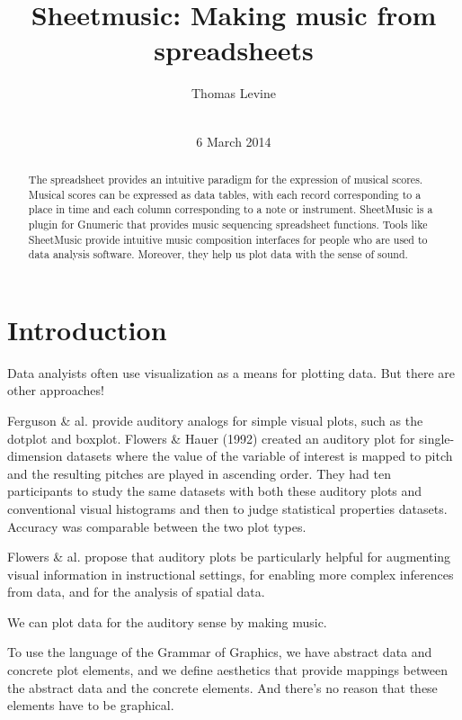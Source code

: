\documentclass{acm_proc_article-sp}
\begin{document}
\title{Sheetmusic: Making music from spreadsheets}
\author{
\alignauthor
Thomas Levine\\
       \\
}
\date{6 March 2014}
\maketitle
\begin{abstract}
The spreadsheet provides an intuitive paradigm for the expression of musical
scores. Musical scores can be expressed as data tables, with each record
corresponding to a place in time and each column corresponding to a note
or instrument. SheetMusic is a plugin for Gnumeric that provides music
sequencing spreadsheet functions. Tools like SheetMusic provide intuitive
music composition interfaces for people who are used to data analysis software.
Moreover, they help us plot data with the sense of sound.
\end{abstract}
\section{Introduction}
Data analyists often use visualization as a means for plotting data.
But there are other approaches!

Ferguson \& al. \cite{ferguson} provide auditory analogs for simple
visual plots, such as the dotplot and boxplot.
Flowers \& Hauer (1992) \cite{flowers1992} created an auditory plot for
single-dimension datasets where the value of the variable of interest
is mapped to pitch and the resulting pitches are played in ascending
order. They had ten participants to study the same datasets with both
these auditory plots and conventional visual histograms and then to
judge statistical properties datasets. Accuracy was comparable between
the two plot types.

Flowers \& al. \cite{flowers2005} propose that auditory plots be
particularly helpful for augmenting visual information in instructional
settings, for enabling more complex inferences from data, and for
the analysis of spatial data.

We can plot data for the auditory sense by making music.

To use the language of the Grammar of Graphics, \cite{XXX}
we have abstract data and concrete plot elements,
and we define aesthetics that provide mappings
between the abstract data and the concrete elements.
And there's no reason that these elements have to be graphical.
\end{document}
